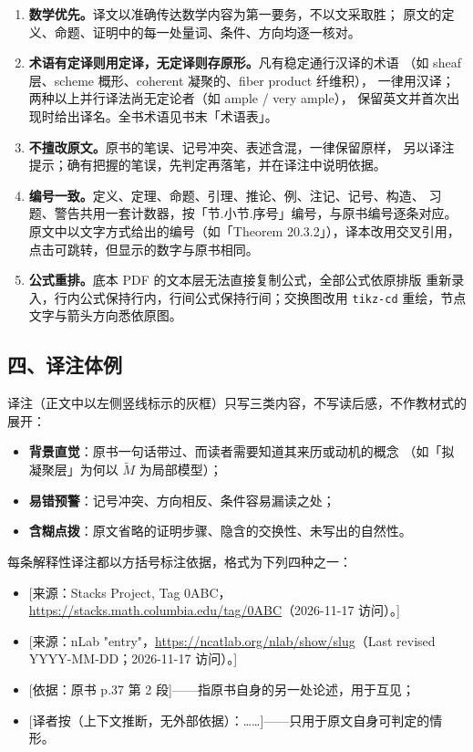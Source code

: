 \begin{enumerate}
\item \textbf{数学优先。}译文以准确传达数学内容为第一要务，不以文采取胜；
      原文的定义、命题、证明中的每一处量词、条件、方向均逐一核对。
\item \textbf{术语有定译则用定译，无定译则存原形。}凡有稳定通行汉译的术语
      （如 sheaf 层、scheme 概形、coherent 凝聚的、fiber product 纤维积），
      一律用汉译；两种以上并行译法尚无定论者（如 ample / very ample），
      保留英文并首次出现时给出译名。全书术语见书末「术语表」。
\item \textbf{不擅改原文。}原书的笔误、记号冲突、表述含混，一律保留原样，
      另以译注提示；确有把握的笔误，先判定再落笔，并在译注中说明依据。
\item \textbf{编号一致。}定义、定理、命题、引理、推论、例、注记、记号、构造、
      习题、警告共用一套计数器，按「节.小节.序号」编号，与原书编号逐条对应。
      原文中以文字方式给出的编号（如「Theorem 20.3.2」），译本改用交叉引用，
      点击可跳转，但显示的数字与原书相同。
\item \textbf{公式重排。}底本 PDF 的文本层无法直接复制公式，全部公式依原排版
      重新录入，行内公式保持行内，行间公式保持行间；交换图改用 \texttt{tikz-cd}
      重绘，节点文字与箭头方向悉依原图。
\end{enumerate}

\subsection*{四、译注体例}

译注（正文中以左侧竖线标示的灰框）只写三类内容，不写读后感，不作教材式的展开：

\begin{itemize}
\item \textbf{背景直觉}：原书一句话带过、而读者需要知道其来历或动机的概念
      （如「拟凝聚层」为何以 \(\widetilde{M}\) 为局部模型）；
\item \textbf{易错预警}：记号冲突、方向相反、条件容易漏读之处；
\item \textbf{含糊点拨}：原文省略的证明步骤、隐含的交换性、未写出的自然性。
\end{itemize}

每条解释性译注都以方括号标注依据，格式为下列四种之一：

\begin{itemize}
\item {}[来源：Stacks Project, Tag 0ABC，\url{https://stacks.math.columbia.edu/tag/0ABC}（2026-11-17 访问）。]
\item {}[来源：nLab "entry"，\url{https://ncatlab.org/nlab/show/slug}（Last revised YYYY-MM-DD；2026-11-17 访问）。]
\item {}[依据：原书 p.37 第 2 段]——指原书自身的另一处论述，用于互见；
\item {}[译者按（上下文推断，无外部依据）：……]——只用于原文自身可判定的情形。
\end{itemize}

